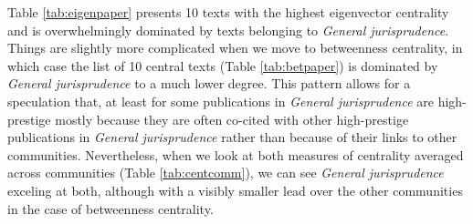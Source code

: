 \documentclass[
]{article}
\begin{document}
Table \ref{tab:eigenpaper} presents 10 texts with the highest eigenvector centrality and is overwhelmingly dominated by texts belonging to \emph{General jurisprudence}. Things are slightly more complicated when we move to betweenness centrality, in which case the list of 10 central texts (Table \ref{tab:betpaper}) is dominated by \emph{General jurisprudence} to a much lower degree. This pattern allows for a speculation that, at least for some publications in \emph{General jurisprudence} are high-prestige mostly because they are often co-cited with other high-prestige publications in \emph{General jurisprudence} rather than because of their links to other communities. Nevertheless, when we look at both measures of centrality averaged across communities (Table \ref{tab:centcomm}), we can see \emph{General jurisprudence} exceling at both, although with a visibly smaller lead over the other communities in the case of betweenness centrality.
\end{document}
